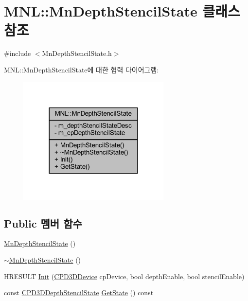\hypertarget{class_m_n_l_1_1_mn_depth_stencil_state}{}\section{M\+NL\+:\+:Mn\+Depth\+Stencil\+State 클래스 참조}
\label{class_m_n_l_1_1_mn_depth_stencil_state}


{\ttfamily \#include $<$Mn\+Depth\+Stencil\+State.\+h$>$}



M\+NL\+:\+:Mn\+Depth\+Stencil\+State에 대한 협력 다이어그램\+:\nopagebreak
\begin{figure}[H]
\begin{center}
\leavevmode
\includegraphics[width=216pt]{class_m_n_l_1_1_mn_depth_stencil_state__coll__graph}
\end{center}
\end{figure}
\subsection*{Public 멤버 함수}
\begin{DoxyCompactItemize}
\item 
\hyperlink{class_m_n_l_1_1_mn_depth_stencil_state_ac8c5a5415f93b0a54837bcfd88e36ab3}{Mn\+Depth\+Stencil\+State} ()
\item 
\hyperlink{class_m_n_l_1_1_mn_depth_stencil_state_a69ad219841e29b837080c7d35d6345b8}{$\sim$\+Mn\+Depth\+Stencil\+State} ()
\item 
H\+R\+E\+S\+U\+LT \hyperlink{class_m_n_l_1_1_mn_depth_stencil_state_a3c269bcb6437435f134cbb1e2e761b0f}{Init} (\hyperlink{namespace_m_n_l_a1eec210db8f309a4a9ac0d9658784c31}{C\+P\+D3\+D\+Device} cp\+Device, bool depth\+Enable, bool stencil\+Enable)
\item 
const \hyperlink{namespace_m_n_l_a8209b06065c025e5d6bc2e8ee5925faf}{C\+P\+D3\+D\+Depth\+Stencil\+State} \hyperlink{class_m_n_l_1_1_mn_depth_stencil_state_aceb187c0cf267621b631531cac28bd27}{Get\+State} () const
\end{DoxyCompactItemize}
